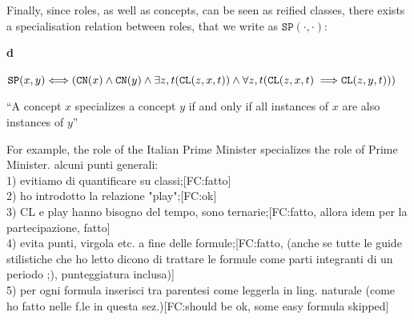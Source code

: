 \documentclass[sw]{iosart2x}
\newcommand{\bflist}{\begin{list}{}{\setlength{\topsep}{2mm}\setlength{\partopsep}{0mm}\setlength{\parsep}{0mm}\setlength{\leftmargin}{9mm}\setlength{\labelwidth}{8mm}}}
\newcommand{\eflist}{\end{list}}
\newcommand{\DefLabel}{\textrm{d}}
\newcounter{cntdef}
\newcommand{\mydf}[1]{\refstepcounter{cntdef}\begin{small}{\bf \DefLabel\thecntdef\label{def:#1}}\end{small}}
\newcommand{\mytext}[1]{``#1''}
\newcommand{\refdf}[1]{({\DefLabel}\ref{#1})}
\newcommand{\generalStyle}[1]{\texttt{#1}}
\newcommand{\biRel}[3]{\generalStyle{#1}(#2,#3)}
\newcommand{\uniRel}[2]{\generalStyle{#1}(#2)}
\newcommand{\triRel}[4]{\generalStyle{#1}(#2,#3,#4)}
\newcommand{\myiff}{\Longleftrightarrow}
\newcommand{\myfi}{\hspace{0.9mm} \Longrightarrow}
\newcommand{\DOLCEConcept}[1]{\uniRel{{CN}}{#1}}
\newcommand{\DOLCECLby}[3]{\triRel{CL}{#1}{#2}{#3}}
\newcommand{\DOLCEConceptSubsum}[2]{\biRel{SP}{#1}{#2}}
\newcommand{\TODO}[1]{{\color{red} #1}}
\begin{document}
Finally, since roles, as well as concepts, can be seen as reified classes, there exists a specialisation relation between roles, that we write as $\DOLCEConceptSubsum{\cdot}{\cdot}$:
\bflist
\item[\mydf{conceptSussum}] $ \DOLCEConceptSubsum{x}{y} \myiff (\DOLCEConcept{x} \land \DOLCEConcept{y} \land \exists z,t (\DOLCECLby{z}{x}{t}) \land \forall z,t (\DOLCECLby{z}{x}{t} \myfi \DOLCECLby{z}{y}{t}) )$%
\item \mytext{A concept $x$ specializes a concept $y$ if and only if all instances of $x$ are also instances of $y$}
\eflist
For example, the role of the Italian Prime Minister specializes the role of Prime Minister.
\TODO{alcuni punti generali:\\
1) evitiamo di quantificare su classi;[FC:fatto]\\ 
2) ho introdotto la relazione "play";[FC:ok]\\ 
3) CL e play hanno bisogno del tempo, sono ternarie;[FC:fatto, allora idem per la partecipazione, fatto]\\
4) evita punti, virgola etc. a fine delle formule;[FC:fatto, (anche se tutte le guide stilistiche che ho letto dicono di trattare le formule come parti integranti di un periodo ;), punteggiatura inclusa)]\\ 
5) per ogni formula inserisci tra parentesi come leggerla in ling. naturale (come ho fatto nelle f.le in questa sez.)[FC:should be ok, some easy formula skipped]}
\end{document}
